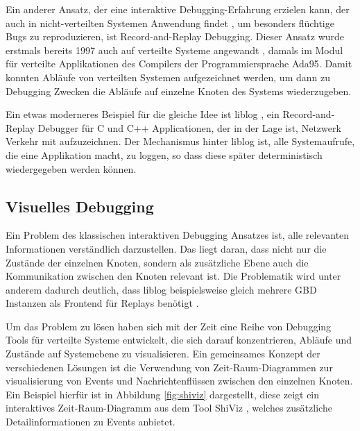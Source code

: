 \documentclass[12pt,a4paper]{report}
\begin{document}
Ein anderer Ansatz, der eine interaktive Debugging-Erfahrung erzielen kann, der auch in nicht-verteilten Systemen Anwendung findet
\cite{normal_record_and_replay}, um besonders flüchtige Bugs zu reproduzieren, ist Record-and-Replay Debugging. Dieser Ansatz
wurde erstmals bereits 1997 auch auf verteilte Systeme angewandt \cite{distributed_replay_debugging_1997}, damals im Modul für
verteilte Applikationen des Compilers der Programmiersprache Ada95. Damit konnten Abläufe von verteilten Systemen aufgezeichnet
werden, um dann zu Debugging Zwecken die Abläufe auf einzelne Knoten des Systems wiederzugeben.

Ein etwas moderneres Beispiel für die gleiche Idee ist liblog \cite{distributed_replay_debugging_2006}, ein Record-and-Replay Debugger für
C und C++ Applicationen, der in der Lage ist, Netzwerk Verkehr mit aufzuzeichnen. Der Mechanismus hinter liblog ist, alle
Systemaufrufe, die eine Applikation macht, zu loggen, so dass diese später deterministisch wiedergegeben werden können.

\subsection{Visuelles Debugging}
Ein Problem des klassischen interaktiven Debugging Ansatzes ist, alle relevanten Informationen verständlich darzustellen. Das
liegt daran, dass nicht nur die Zustände der einzelnen Knoten, sondern als zusätzliche Ebene auch die Kommunikation
zwischen den Knoten relevant ist. Die Problematik wird unter anderem dadurch deutlich, dass liblog beispielsweise gleich mehrere
GBD Instanzen als Frontend für Replays benötigt \cite{distributed_replay_debugging_2006}.

Um das Problem zu lösen haben sich mit der Zeit eine Reihe von Debugging Tools für verteilte Systeme entwickelt, die sich darauf
konzentrieren, Abläufe und Zustände auf Systemebene zu visualisieren. Ein gemeinsames Konzept der verschiedenen Lösungen ist die
Verwendung von Zeit-Raum-Diagrammen zur visualisierung von Events und Nachrichtenflüssen zwischen den einzelnen Knoten. Ein
Beispiel hierfür ist in Abbildung \ref{fig:shiviz} dargestellt, diese zeigt ein interaktives Zeit-Raum-Diagramm aus dem Tool
ShiViz \cite{ShiViz_visual_debugger}, welches zusätzliche Detailinformationen zu Events anbietet.
\end{document}
